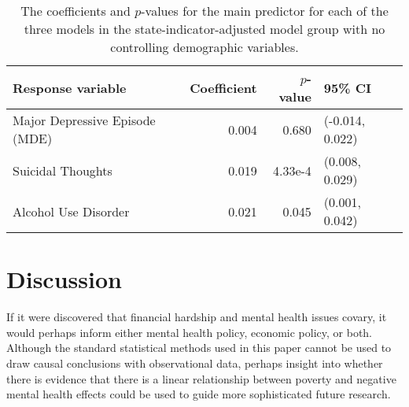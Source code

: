 \documentclass{article}
\begin{document}
\begin{table}[!htb]
\begin{center}
\begin{tabular}{l r r l}
    \toprule
    Response variable & Coefficient & $p$-value & 95\% CI\\
    \midrule
    Major Depressive Episode (MDE) & 0.004 & 0.680 & (-0.014, 0.022)\\
    Suicidal Thoughts & 0.019 & 4.33e-4 & (0.008, 0.029)\\
    Alcohol Use Disorder & 0.021 & 0.045 & (0.001, 0.042)\\
    \bottomrule
\end{tabular}
\caption{\label{tab:state-ind-only-model-results} The coefficients and $p$-values
    for the main predictor for each of the three models
    in the state-indicator-adjusted model group with no controlling demographic variables.
}
\end{center}
\end{table}


\section{Discussion}


If it were discovered that financial hardship and mental
health issues covary, it would perhaps inform
either mental health policy, economic policy, or both.
Although the standard statistical methods used in this paper
cannot be used to draw causal conclusions with observational data,
perhaps insight into whether there is evidence that there
is a linear relationship between poverty and negative mental health effects
could be used to guide more sophisticated future research.
\end{document}
